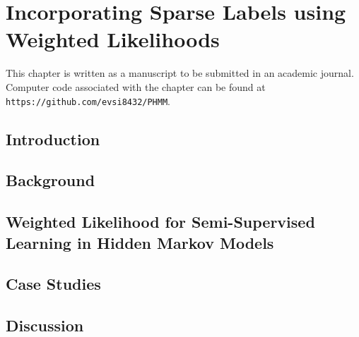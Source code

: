 \chapter{Incorporating Sparse Labels using Weighted Likelihoods}

This chapter is written as a manuscript to be submitted in an academic journal. Computer code associated with the chapter can be found at \texttt{https://github.com/evsi8432/PHMM}.

\section{Introduction}
\label{sec:chp3_intro}


\section{Background}
\label{sec:chp3_background}


\section{Weighted Likelihood for Semi-Supervised Learning in Hidden Markov Models}
\label{sec:chp3_mod}


%

\section{Case Studies}
\label{sec:chp3_case}



\section{Discussion}
\label{sec:chp3_discussion}
